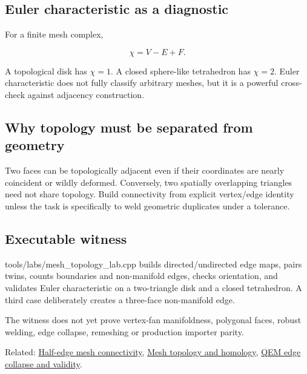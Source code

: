 \subsection{Euler characteristic as a diagnostic}\label{appendix-faac749c9cdd-euler-characteristic-as-a-diagnostic}

For a finite mesh complex,

\[
\chi = V-E+F.
\]

A topological disk has \(\chi=1\). A closed sphere-like tetrahedron has \(\chi=2\). Euler characteristic does not fully classify arbitrary meshes, but it is a powerful cross-check against adjacency construction.

\subsection{Why topology must be separated from geometry}\label{appendix-faac749c9cdd-why-topology-must-be-separated-from-geometry}

Two faces can be topologically adjacent even if their coordinates are nearly coincident or wildly deformed. Conversely, two spatially overlapping triangles need not share topology. Build connectivity from explicit vertex/edge identity unless the task is specifically to weld geometric duplicates under a tolerance.

\subsection{Executable witness}\label{appendix-faac749c9cdd-executable-witness}

tools/labs/mesh\_topology\_lab.cpp builds directed/undirected edge maps, pairs twins, counts boundaries and non-manifold edges, checks orientation, and validates Euler characteristic on a two-triangle disk and a closed tetrahedron. A third case deliberately creates a three-face non-manifold edge.

The witness does not yet prove vertex-fan manifoldness, polygonal faces, robust welding, edge collapse, remeshing or production importer parity.

Related: \hyperref[appendix-1aea26b2307f]{Half-edge mesh connectivity}, \hyperref[appendix-e38976cbbf86]{Mesh topology and homology}, \hyperref[appendix-89db9fe1bc8a]{QEM edge collapse and validity}.

